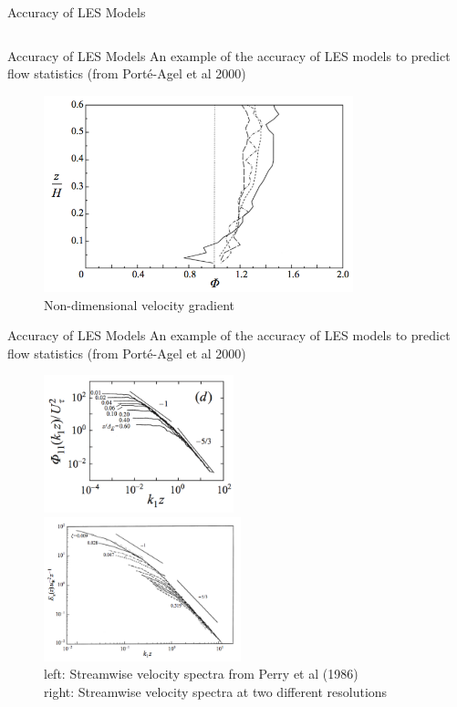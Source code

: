 \begin{frame}{Accuracy of LES Models}
\begin{columns}[T]
\begin{column}{.5\textwidth}
    \end{column}
  \end{columns}
\end{frame}

\begin{frame}{Accuracy of LES Models}
An example of the accuracy of LES models to predict flow statistics (from Port\'{e}-Agel et al 2000)
\begin{figure}
\includegraphics[width=0.8\textwidth]{compare9}
~\\Non-dimensional velocity gradient 
\end{figure}
\end{frame}

\begin{frame}{Accuracy of LES Models}
An example of the accuracy of LES models to predict flow statistics (from Port\'{e}-Agel et al 2000)
\begin{figure}
\includegraphics[width=0.49\textwidth]{compare10}
\includegraphics[width=0.51\textwidth]{compare11}
~\\left: Streamwise velocity spectra from Perry et al (1986)\\right: Streamwise velocity spectra at two  different resolutions 
\end{figure}
\end{frame}

